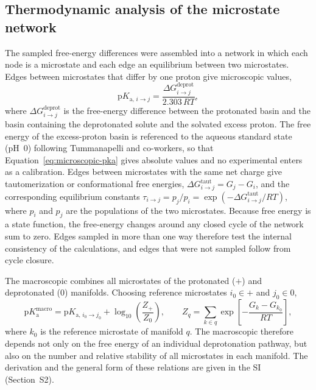 \subsection{Thermodynamic analysis of the microstate network}
\label{sec:network}

The sampled free-energy differences were assembled into a network in which each node is a microstate and each edge an equilibrium between two microstates.\cite{ullmannRelationsProtonationConstants2003,bombardaPHDependentPKaValues2010}
Edges between microstates that differ by one proton give microscopic \pka{} values,
\begin{equation}
\mathrm{p}K_{\mathrm{a},\,i\rightarrow j}
=
\frac{\Delta G_{i\rightarrow j}^{\mathrm{deprot}}}{2.303\,RT},
\label{eq:microscopic-pka}
\end{equation}
where $\Delta G_{i\rightarrow j}^{\mathrm{deprot}}$ is the free-energy difference between the protonated basin and the basin containing the deprotonated solute and the solvated excess proton.\cite{Sakti2018}
The free energy of the excess-proton basin is referenced to the aqueous standard state (pH~0) following Tummanapelli and co-workers,\cite{Tummanapelli2014} so that Equation~\ref{eq:microscopic-pka} gives absolute \pka{} values and no experimental \pka{} enters as a calibration.
Edges between microstates with the same net charge give tautomerization or conformational free energies, $\Delta G_{i\rightarrow j}^{\mathrm{taut}}=G_j-G_i$, and the corresponding equilibrium constants $\tau_{i\rightarrow j}=p_j/p_i=\exp(-\Delta G_{i\rightarrow j}^{\mathrm{taut}}/RT)$, where $p_i$ and $p_j$ are the populations of the two microstates.
Because free energy is a state function, the free-energy changes around any closed cycle of the network sum to zero.
Edges sampled in more than one way therefore test the internal consistency of the calculations, and edges that were not sampled follow from cycle closure.

The macroscopic \pka{} combines all microstates of the protonated ($+$) and deprotonated ($0$) manifolds.
Choosing reference microstates $i_0\in+$ and $j_0\in0$,
\begin{equation}
\mathrm{p}K_{\mathrm{a}}^{\mathrm{macro}}
=
\mathrm{p}K_{\mathrm{a},\,i_0\rightarrow j_0}
+
\log_{10}\!\left(\frac{Z_{+}}{Z_{0}}\right),
\qquad
Z_{q}=\sum_{k\in q}\exp\left[-\frac{G_k-G_{k_0}}{RT}\right],
\label{eq:macroscopic-pka}
\end{equation}
where $k_0$ is the reference microstate of manifold $q$.
The macroscopic \pka{} therefore depends not only on the free energy of an individual deprotonation pathway, but also on the number and relative stability of all microstates in each manifold.
The derivation and the general form of these relations are given in the SI (Section~S2).

